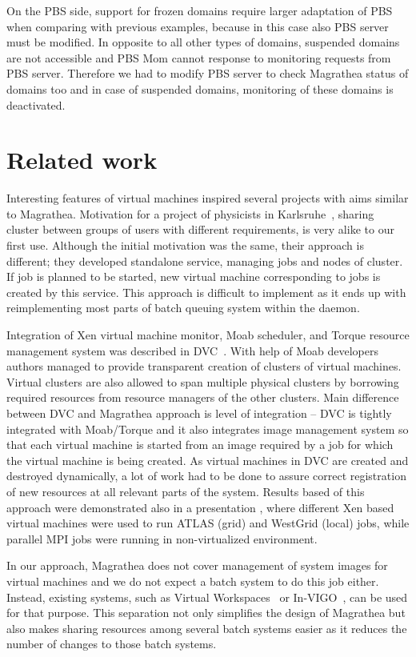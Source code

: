 \documentclass{sig-alternate}
\begin{document}
On the PBS side, support for frozen domains require larger adaptation of PBS when comparing with previous examples, because in this 
case also PBS server must be modified. In opposite to all other types of domains, suspended domains are not accessible 
and PBS Mom cannot response to monitoring requests from PBS server.  Therefore we had to modify PBS server to check 
Magrathea status of domains too and in case of suspended domains, monitoring of these domains is deactivated.

\section{Related work}

Interesting features of virtual machines inspired several projects with aims similar to Magrathea.
Motivation for a project of physicists in Karlsruhe~\cite{karlsruhe}, sharing cluster between groups of
users with different requirements, is very alike to our first use. Although the
initial motivation was the same, their approach is different; they developed standalone service, managing
jobs and nodes of cluster.  If job is planned to be started, new virtual machine corresponding to jobs
is created by this service.
This approach is difficult to implement as it ends up with reimplementing most parts of batch queuing
system within the daemon. 

Integration of Xen virtual machine monitor, Moab scheduler, and Torque resource management system
was described in DVC~\cite{dvc}. With help of Moab developers authors managed 
to provide transparent creation of clusters of virtual machines. Virtual clusters are also allowed to
span multiple physical clusters by borrowing required resources from resource managers of the other
clusters. Main difference between DVC and Magrathea approach is level of integration -- DVC is tightly
integrated with Moab/Torque and it also integrates image
management system so that each virtual machine is started from an image required by a
job for which the virtual machine is being created. As virtual machines in DVC
are created and destroyed dynamically, a lot of work had to be done to assure
correct registration of new resources at all relevant parts of the system.
Results based of this approach were demonstrated also in a presentation \cite{chep07}, where different
Xen based virtual machines were used to run ATLAS (grid) and WestGrid (local) jobs, while parallel
MPI jobs were running in non-virtualized environment.

In our approach, Magrathea does not cover management of system images for virtual machines and
we do not expect a batch system to do this job either. Instead, existing
systems, such as Virtual Workspaces~\cite{workspaces} or
In-VIGO~\cite{invigo}, can be used for that purpose. This separation not only
simplifies the design of Magrathea but also makes sharing resources among
several batch systems easier as it reduces the number of changes to those
batch systems.
\end{document}
